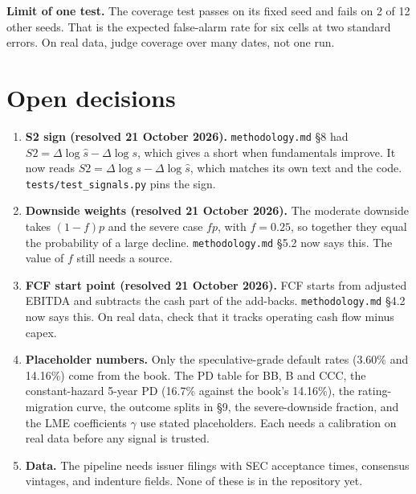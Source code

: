 \documentclass[11pt,a4paper]{article}
\newcommand{\code}[1]{\texttt{\small #1}}
\begin{document}
\textbf{Limit of one test.} The coverage test passes on its fixed seed and fails on 2 of 12 other seeds. That is the expected false-alarm rate for six cells at two standard errors. On real data, judge coverage over many dates, not one run.

\section{Open decisions}
\label{sec:open}
\begin{enumerate}
\item \textbf{S2 sign (resolved 21 October 2026).} \code{methodology.md} \S8 had $S2=\Delta\log\hat s-\Delta\log s$, which gives a short when fundamentals improve. It now reads $S2=\Delta\log s-\Delta\log\hat s$, which matches its own text and the code. \code{tests/test\_signals.py} pins the sign.
\item \textbf{Downside weights (resolved 21 October 2026).} The moderate downside takes $(1-f)p$ and the severe case $fp$, with $f=0.25$, so together they equal the probability of a large decline. \code{methodology.md} \S5.2 now says this. The value of $f$ still needs a source.
\item \textbf{FCF start point (resolved 21 October 2026).} FCF starts from adjusted EBITDA and subtracts the cash part of the add-backs. \code{methodology.md} \S4.2 now says this. On real data, check that it tracks operating cash flow minus capex.
\item \textbf{Placeholder numbers.} Only the speculative-grade default rates (3.60\% and 14.16\%) come from the book. The PD table for BB, B and CCC, the constant-hazard 5-year PD (16.7\% against the book's 14.16\%), the rating-migration curve, the outcome splits in \S9, the severe-downside fraction, and the LME coefficients $\gamma$ use stated placeholders. Each needs a calibration on real data before any signal is trusted.
\item \textbf{Data.} The pipeline needs issuer filings with SEC acceptance times, consensus vintages, and indenture fields. None of these is in the repository yet.
\end{enumerate}
\end{document}
